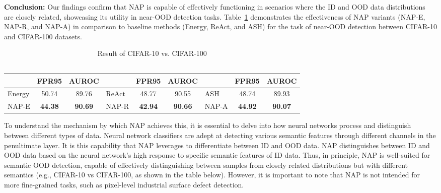\textbf{Conclusion:} Our findings confirm that NAP is capable of effectively functioning in scenarios where the ID and OOD data distributions are closely related, showcasing its utility in near-OOD detection tasks. Table~\ref{tab:cifar10-cifar100} demonstrates the effectiveness of NAP variants (NAP-E, NAP-R, and NAP-A) in comparison to baseline methods (Energy, ReAct, and ASH) for the task of near-OOD detection between CIFAR-10 and CIFAR-100 datasets.

\begin{table}[!h]
\scriptsize
\centering
\caption{Result of CIFAR-10 vs. CIFAR-100\\\quad\\}
\label{tab:cifar10-cifar100}
\begin{tabular}{@{}lcclcclcc@{}}
\toprule
       & FPR95 & \multicolumn{1}{c|}{AUROC} &       & FPR95 & \multicolumn{1}{c|}{AUROC} & & FPR95 & AUROC\\ \midrule
Energy & 50.74      & \multicolumn{1}{c|}{89.76}      & ReAct   & 48.77      & \multicolumn{1}{c|}{90.55} & ASH   & 48.74      & 89.93     \\
NAP-E  & \textbf{44.38}      & \multicolumn{1}{c|}{\textbf{90.69}}      & NAP-R & \textbf{42.94}      & \multicolumn{1}{c|}{\textbf{90.66}} & NAP-A & \textbf{44.92}      & \textbf{90.07}     \\ \bottomrule
\end{tabular}
\end{table}

To understand the mechanism by which NAP achieves this, it is essential to delve into how neural networks process and distinguish between different types of data. Neural network classifiers are adept at detecting various semantic features through different channels in the penultimate layer. It is this capability that NAP leverages to differentiate between ID and OOD data.
NAP distinguishes between ID and OOD data based on the neural network's high response to specific semantic features of ID data. Thus, in principle, NAP is well-suited for semantic OOD detection, capable of effectively distinguishing between samples from closely related distributions but with different semantics (e.g., CIFAR-10 vs CIFAR-100, as shown in the table below). However, it is important to note that NAP is not intended for more fine-grained tasks, such as pixel-level industrial surface defect detection.

